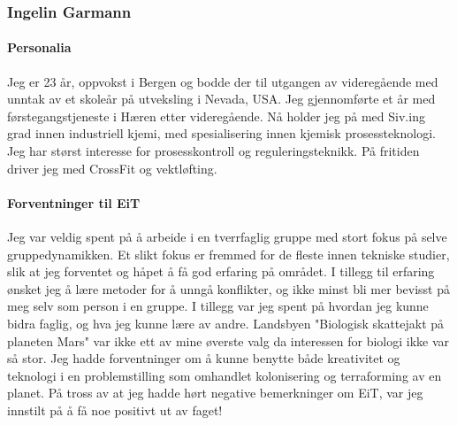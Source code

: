 \subsubsection{Ingelin Garmann}

\paragraph{Personalia}
Jeg er 23 år, oppvokst i Bergen og bodde der til utgangen av videregående med unntak av et skoleår på utveksling i Nevada, USA.
Jeg gjennomførte et år med førstegangstjeneste i Hæren etter videregående.
Nå holder jeg på med Siv.ing grad innen industriell kjemi, med spesialisering innen kjemisk prosessteknologi. Jeg har størst interesse for prosesskontroll og reguleringsteknikk.
På fritiden driver jeg med CrossFit og vektløfting.
\\
\paragraph{Forventninger til EiT}
Jeg var veldig spent på å arbeide i en tverrfaglig gruppe med stort fokus på selve gruppedynamikken.
Et slikt fokus er fremmed for de fleste innen tekniske studier, slik at jeg forventet og håpet å få god erfaring på området.
I tillegg til erfaring ønsket jeg å lære metoder for å unngå konflikter, og ikke minst bli mer bevisst på meg selv som person i en gruppe.
I tillegg var jeg spent på hvordan jeg kunne bidra faglig, og hva jeg kunne lære av andre.
Landsbyen "Biologisk skattejakt på planeten Mars" var ikke ett av mine øverste valg da interessen for biologi ikke var så stor.
Jeg hadde forventninger om å kunne benytte både kreativitet og teknologi i en problemstilling som omhandlet kolonisering og terraforming av en planet.
På tross av at jeg hadde hørt negative bemerkninger om EiT, var jeg innstilt på å få noe positivt ut av faget!
\\
